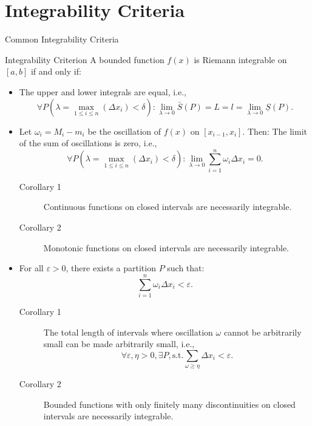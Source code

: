 \documentclass[11pt]{../../TexTemplate/elegantbook}
\begin{document}
\section{Integrability Criteria}
\begin{leftbarTitle}{Common Integrability Criteria}\end{leftbarTitle}
\begin{theorem}{Integrability Criterion}
    A bounded function \( f(x) \) is Riemann integrable on \( [a, b] \) if and only if:
    \begin{itemize}
        \item  The upper and lower integrals are equal, i.e.,
            \[
            \forall P(\lambda = \max_{1 \leqslant i \leqslant n}(\Delta x_{i}) < \delta): 
                \lim_{\lambda \to 0} \bar{S}(P) = L = l = \lim_{\lambda \to 0} \underline{S}(P).
            \]
        \item  Let \( \omega_{i} = M_{i} - m_{i} \) be the oscillation of \( f(x) \) on \( [x_{i-1}, x_{i}] \). Then:
            The limit of the sum of oscillations is zero, i.e.,
            \[
            \forall P(\lambda = \max_{1 \leqslant i \leqslant n}(\Delta x_{i}) < \delta): 
            \lim_{\lambda \to 0} \sum_{i=1}^{n} \omega_{i} \Delta x_{i} = 0.
            \]
            \begin{description}
                \item [Corollary 1] Continuous functions on closed intervals are necessarily integrable.
                \item [Corollary 2] Monotonic functions on closed intervals are necessarily integrable.
            \end{description}
        \item For all \( \varepsilon > 0 \), there exists a partition \( P \) such that:
            \[
            \sum\limits_{i=1}^{n} \omega_{i} \Delta x_{i} < \varepsilon.
            \]
            \begin{description}
                \item [Corollary 1] The total length of intervals where oscillation \( \omega \) 
                    cannot be arbitrarily small can be made arbitrarily small, i.e.,
                    \[
                    \forall \varepsilon, \eta > 0, \exists P,\text{s.t.} \sum_{\omega\geqslant \eta} \Delta x_{i} < \varepsilon.
                    \]
                \item [Corollary 2] Bounded functions with only finitely many discontinuities on closed intervals 
                    are necessarily integrable.
            \end{description}
    \end{itemize}
\end{theorem}
\end{document}
